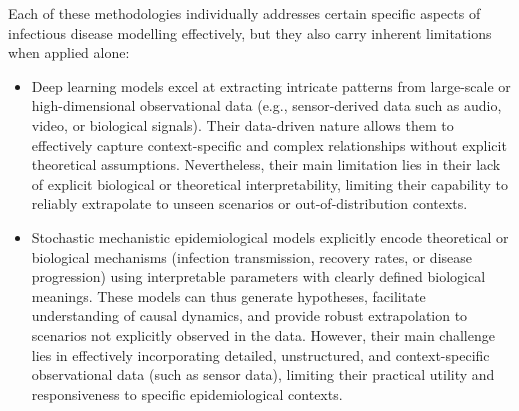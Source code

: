 Each of these methodologies individually addresses certain specific aspects of infectious disease modelling effectively, but they also carry inherent limitations when applied alone:
\begin{itemize}
    \item Deep learning models excel at extracting intricate patterns from large-scale or high-dimensional observational data (e.g., sensor-derived data such as audio, video, or biological signals). Their data-driven nature allows them to effectively capture context-specific and complex relationships without explicit theoretical assumptions. Nevertheless, their main limitation lies in their lack of explicit biological or theoretical interpretability, limiting their capability to reliably extrapolate to unseen scenarios or out-of-distribution contexts.
    \item Stochastic mechanistic epidemiological models explicitly encode theoretical or biological mechanisms (infection transmission, recovery rates, or disease progression) using interpretable parameters with clearly defined biological meanings. These models can thus generate hypotheses, facilitate understanding of causal dynamics, and provide robust extrapolation to scenarios not explicitly observed in the data. However, their main challenge lies in effectively incorporating detailed, unstructured, and context-specific observational data (such as sensor data), limiting their practical utility and responsiveness to specific epidemiological contexts.
\end{itemize}






